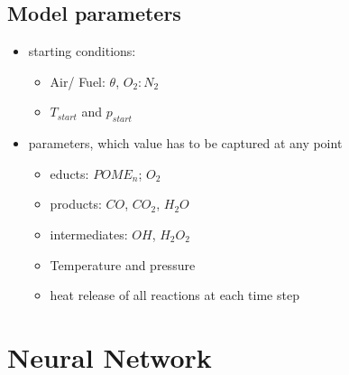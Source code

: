 \documentclass[12pt,oneside,a4paper,english]{article}
\begin{document}
\subsection{Model parameters} %
\begin{itemize}
\item{starting conditions:}

	\begin{itemize}
	\item{Air/ Fuel: $\theta$, $O_2:N_2$}
	\item{$T_{start}$ and $p_{start}$}
	\end{itemize}

\item{parameters, which value has to be captured at any point}

	\begin{itemize}
	\item{educts: $POME_n$; $O_2$}
	\item{products: $CO$, $CO_2$, $H_2O$}
	\item{intermediates: $OH$, $H_2O_2$}
	\item{Temperature and pressure}
	\item{heat release of all reactions at each time step}
	\end{itemize}

\end{itemize}

\newpage %

\section{Neural Network}


\label{EndOfText}

\newpage %



\thispagestyle{fancy}

\label{endOfDoc}
\end{document}
